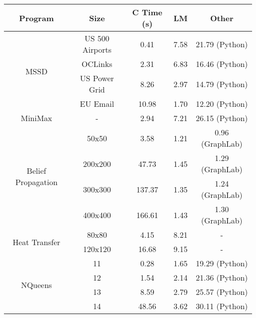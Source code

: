 \begin{tabular}{c | c || c | c | c} \hline
	\textbf{Program} & \textbf{Size} & \textbf{C Time} (s) & \textbf{LM} & \textbf{Other} \\ \hline \hline
	\multirow{4}{*}{MSSD}  & US 500 Airports &  0.41  &  7.58  &  21.79 (Python) \\
		 & OCLinks &  2.31  &  6.83  &  16.46 (Python) \\
		 & US Power Grid &  8.26  &  2.97  &  14.79 (Python) \\
		 & EU Email &  10.98  &  1.70  &  12.20 (Python) \\
	\hline
	MiniMax  & - &  2.94  &  7.21  &  26.15 (Python) \\
	\hline
	\multirow{4}{*}{Belief Propagation}  & 50x50 &  3.58  &  1.21  &  0.96 (GraphLab) \\
		 & 200x200 &  47.73  &  1.45  &  1.29 (GraphLab) \\
		 & 300x300 &  137.37  &  1.35  &  1.24 (GraphLab) \\
		 & 400x400 &  166.61  &  1.43  &  1.30 (GraphLab) \\
	\hline
	\multirow{2}{*}{Heat Transfer}  & 80x80 &  4.15  &  8.21  &  - \\
		 & 120x120 &  16.68  &  9.15  &  - \\
	\hline
	\multirow{4}{*}{NQueens}  & 11 &  0.28  &  1.65  &  19.29 (Python) \\
		 & 12 &  1.54  &  2.14  &  21.36 (Python) \\
		 & 13 &  8.59  &  2.79  &  25.57 (Python) \\
		 & 14 &  48.56  &  3.62  &  30.11 (Python) \\
	\hline
\end{tabular}
